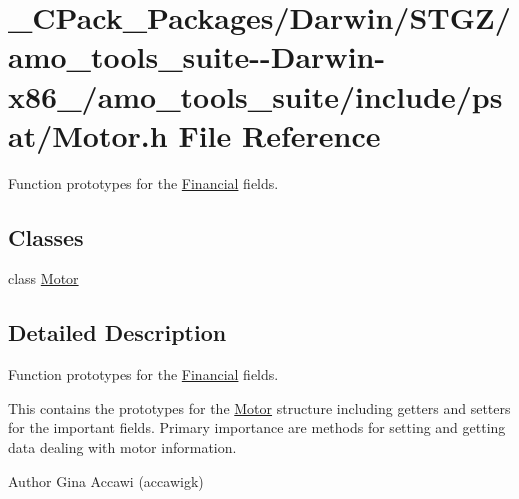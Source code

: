 \hypertarget{___c_pack___packages_2_darwin_2_s_t_g_z_2amo__tools__suite--_darwin-x86__64_2amo__tools__suite_2include_2psat_2_motor_8h}{}\section{\+\_\+\+C\+Pack\+\_\+\+Packages/\+Darwin/\+S\+T\+G\+Z/amo\+\_\+tools\+\_\+suite-\/-\/\+Darwin-\/x86\+\_/amo\+\_\+tools\+\_\+suite/include/psat/\+Motor.h File Reference}
\label{___c_pack___packages_2_darwin_2_s_t_g_z_2amo__tools__suite--_darwin-x86__64_2amo__tools__suite_2include_2psat_2_motor_8h}


Function prototypes for the \hyperlink{class_financial}{Financial} fields.  


\subsection*{Classes}
\begin{DoxyCompactItemize}
\item 
class \hyperlink{class_motor}{Motor}
\end{DoxyCompactItemize}


\subsection{Detailed Description}
Function prototypes for the \hyperlink{class_financial}{Financial} fields. 

This contains the prototypes for the \hyperlink{class_motor}{Motor} structure including getters and setters for the important fields. Primary importance are methods for setting and getting data dealing with motor information.

\begin{DoxyAuthor}{Author}
Gina Accawi (accawigk) 
\end{DoxyAuthor}
